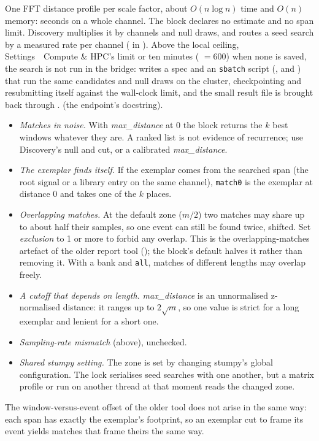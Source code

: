 One FFT distance profile per scale factor, about $O(n \log n)$ time and $O(n)$ memory: seconds on a
whole channel. The block declares no estimate and no span limit. Discovery multiplies it by
channels and null draws, and routes a seed search by a measured rate per channel
( in ). Above the local ceiling,
Settings~\textrightarrow~Compute \& HPC's limit or ten minutes ( $= 600$) when
none is saved, the search is not run in the bridge:  writes a spec and an
\texttt{sbatch} script (,  and
) that run the same candidates and null draws on the cluster, checkpointing and
resubmitting itself against the wall-clock limit, and the small result file is brought back through
.  (the endpoint's docstring).

\begin{itemize}
\item \emph{Matches in noise.} With \emph{max\_distance} at 0 the block returns the $k$ best
  windows whatever they are. A ranked list is not evidence of recurrence; use Discovery's null and
  cut, or a calibrated \emph{max\_distance}.
\item \emph{The exemplar finds itself.} If the exemplar comes from the searched span (the root
  signal or a library entry on the same channel), \texttt{match0} is the exemplar at distance 0 and
  takes one of the $k$ places.
\item \emph{Overlapping matches.} At the default zone ($m/2$) two matches may share up to about
  half their samples, so one event can still be found twice, shifted. Set \emph{exclusion} to 1 or
  more to forbid any overlap. This is the overlapping-matches artefact of the older report tool
  (); the block's default halves it rather than removing it. With a
  bank and \texttt{all}, matches of different lengths may overlap freely.
\item \emph{A cutoff that depends on length.} \emph{max\_distance} is an unnormalised
  z-normalised distance: it ranges up to $2\sqrt{m}$, so one value is strict for a long exemplar and
  lenient for a short one.
\item \emph{Sampling-rate mismatch} (above), unchecked.
\item \emph{Shared stumpy setting.} The zone is set by changing stumpy's global configuration. The
  lock serialises seed searches with one another, but a matrix profile or
   run on another thread at that moment reads the changed zone.
\end{itemize}
The window-versus-event offset of the older tool does not arise in the same way: each span has
exactly the exemplar's footprint, so an exemplar cut to frame its event yields matches that frame
theirs the same way.

